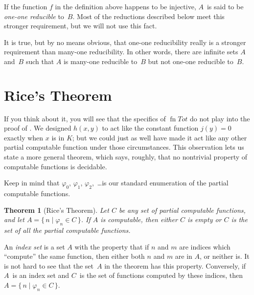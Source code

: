 \documentclass[10pt,a4paper]{article}
\makeatletter
\theoremstyle{plain}
\newtheorem{thm}{Theorem}[section]
\theoremstyle{definition}
\theoremstyle{remark}
\newenvironment{digress}{}{}
\newcommand*{\olfileid}[3]{}
\newcommand*{\olsection}[1]{\section*{#1}}
\newcommand{\olref}{\@ifnextchar[{\olref@i}{\olref@final}}
\def\olref@i[#1]{\@ifnextchar[{\olref@ii}{\olref@final}}
\def\olref@ii[#1]{\@ifnextchar[{\olref@iii}{\olref@final}}
\def\olref@iii[#1]{\olref@final}
\def\olref@final#1{\ref{#1}}
\providecommand{\cfind}[1]{\varphi_{#1}}
\providecommand{\Setabs}[2]{\{\, #1 \mid #2 \,\}}
\providecommand{\fn}{\operatorname{fn}}
\makeatother
\begin{document}
If the function $f$ in the definition above happens to be injective,
$A$~is said to be \emph{one-one reducible} to~$B$. Most of the
reductions described below meet this stronger requirement, but we will
not use this fact.

\begin{digress}
It is true, but by no means obvious, that one-one reducibility really
is a stronger requirement than many-one reducibility. In other words,
there are infinite sets $A$ and~$B$ such that $A$ is many-one
reducible to~$B$ but not one-one reducible to~$B$.
\end{digress}





\olfileid{cmp}{thy}{rce}
\olsection{Rice's Theorem}

If you think about it, you will see that the specifics of $\fn{Tot}$
do not play into the proof of \olref[tot]{prop:total}. We designed
$h(x,y)$ to act like the constant function $j(y) = 0$ exactly when $x$
is in $K$; but we could just as well have made it act like any other
partial computable function under those circumstances. This
observation lets us state a more general theorem, which says, roughly,
that no nontrivial property of computable functions is decidable.

Keep in mind that $\cfind{0}$, $\cfind{1}$, $\cfind{2}$,~\dots is our
standard enumeration of the partial computable functions.

\begin{thm}[Rice's Theorem]
  Let $C$ be any set of partial computable functions, and let $A =
  \Setabs{n}{\cfind{n} \in C}$. If $A$ is computable, then either $C$
  is empty or $C$ is the set of all the partial computable
  functions.
\end{thm}

An {\em index set} is a set $A$ with the property that if $n$ and $m$
are indices which ``compute'' the same function, then either both $n$
and $m$ are in $A$, or neither is. It is not hard to see that the
set~$A$ in the theorem has this property. Conversely, if $A$~is an
index set and $C$~is the set of functions computed by these indices,
then $A = \Setabs{n}{\cfind{n} \in C}$.
\end{document}

